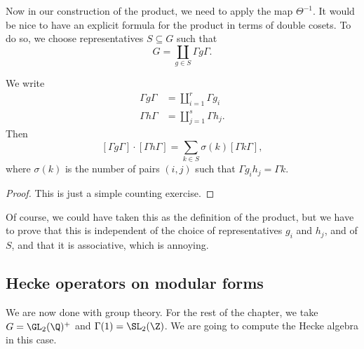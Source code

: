 \documentclass[a4paper]{article}
\begin{document}
Now in our construction of the product, we need to apply the map $\Theta^{-1}$. It would be nice to have an explicit formula for the product in terms of double cosets. To do so, we choose representatives $S \subseteq G$ such that
\[
  G = \coprod_{g \in S} \Gamma g \Gamma.
\]
\begin{prop}
  We write
  \begin{align*}
    \Gamma g \Gamma &= \coprod_{i = 1}^r \Gamma g_i\\
    \Gamma h \Gamma &= \coprod_{j = 1}^s \Gamma h_j.
  \end{align*}
  Then
  \[
    [\Gamma g \Gamma] \cdot [\Gamma h \Gamma] = \sum_{k \in S} \sigma(k) [\Gamma k \Gamma],
  \]
  where $\sigma(k)$ is the number of pairs $(i, j)$ such that $\Gamma g_i h_j = \Gamma k$.
\end{prop}

\begin{proof}
  This is just a simple counting exercise.
\end{proof}

%
Of course, we could have taken this as the definition of the product, but we have to prove that this is independent of the choice of representatives $g_i$ and $h_j$, and of $S$, and that it is associative, which is annoying.

\subsection{Hecke operators on modular forms}
We are now done with group theory. For the rest of the chapter, we take $G = \GL_2(\Q)^+$ and $\Gamma(1) = \SL_2(\Z)$. We are going to compute the Hecke algebra in this case.
\end{document}
